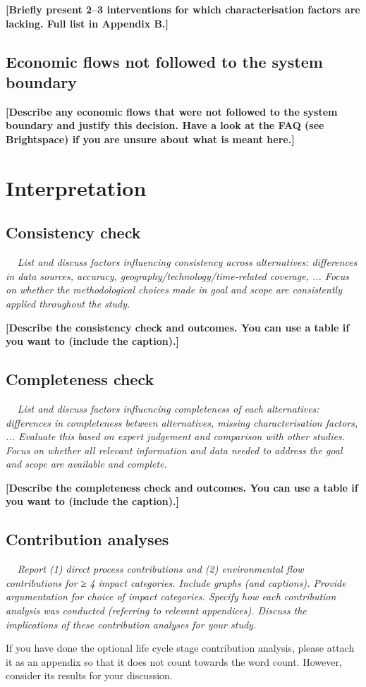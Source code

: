 \documentclass[10pt]{article}
\newcommand{\placeholder}[1]{\textcolor{lcaph}{\textbf{#1}}}    %
\newcommand{\infoicon}{{\setlength{\fboxsep}{1pt}\colorbox{lcablue}{\textcolor{white}{\upshape\bfseries\,i\,}}}}
\newcommand{\guidance}[1]{\par\noindent\colorbox{lcabox}{\parbox{\dimexpr\linewidth-2\fboxsep}{\setlength{\parskip}{2pt}\small\itshape\infoicon\ \color{lcatext}#1}}\par}
\begin{document}
\placeholder{[Briefly present 2--3 interventions for which characterisation factors are lacking. Full list in Appendix B.]}

\subsection{Economic flows not followed to the system boundary}
\placeholder{[Describe any economic flows that were not followed to the system boundary and justify this decision. Have a look at the FAQ (see Brightspace) if you are unsure about what is meant here.]}

\section{Interpretation}
\subsection{Consistency check}
\guidance{List and discuss factors influencing consistency across alternatives: differences in data sources, accuracy, geography/technology/time-related coverage, ... Focus on whether the methodological choices made in goal and scope are consistently applied throughout the study.}

\placeholder{[Describe the consistency check and outcomes. You can use a table if you want to (include the caption).]}

\subsection{Completeness check}
\guidance{List and discuss factors influencing completeness of each alternatives: differences in completeness between alternatives, missing characterisation factors, ... Evaluate this based on expert judgement and comparison with other studies. Focus on whether all relevant information and data needed to address the goal and scope are available and complete.}

\placeholder{[Describe the completeness check and outcomes. You can use a table if you want to (include the caption).]}

\subsection{Contribution analyses}
\guidance{Report (1) direct process contributions and (2) environmental flow contributions for ≥ 4 impact categories. Include graphs (and captions). Provide argumentation for choice of impact categories. Specify how each contribution analysis was conducted (referring to relevant appendices). Discuss the implications of these contribution analyses for your study.\par
If you have done the optional life cycle stage contribution analysis, please attach it as an appendix so that it does not count towards the word count. However, consider its results for your discussion.}
\end{document}
